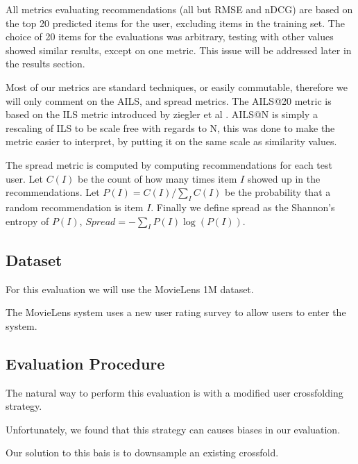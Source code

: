 \documentclass[letterpaper]{sig-alternate}
\begin{document}
  All metrics evaluating recommendations (all but RMSE and nDCG) are based on the top 20 predicted items for the user, excluding items in the training set.
  The choice of 20 items for the evaluations was arbitrary, testing with other values showed similar results, except on one metric.
  This issue will be addressed later in the results section.
  
  Most of our metrics are standard techniques, or easily commutable, therefore we will only comment on the AILS, and spread metrics.
  The AILS@20 metric is based on the ILS metric introduced by ziegler et al \cite{ziegler}.
  AILS@N is simply a rescaling of ILS to be scale free with regards to N, this was done to make the metric easier to interpret, by putting it on the same scale as similarity values.
  
  The spread metric is computed by computing recommendations for each test user.
  Let $C(I)$ be the count of how many times item $I$ showed up in the recommendations.
  Let $P(I) = C(I) / \sum_I C(I)$ be the probability that a random recommendation is item $I$.
  Finally we define spread as the Shannon's entropy of $P(I)$, $Spread = -\sum_I P(I) \log(P(I))$.
  
  \subsection*{Dataset}
  For this evaluation we will use the MovieLens 1M dataset.

  The MovieLens system uses a new user rating survey to allow users to enter the system.
  
  \subsection*{Evaluation Procedure}
  The natural way to perform this evaluation is with a modified user crossfolding strategy.
  
  Unfortunately, we found that this strategy can causes biases in our evaluation.
  
  Our solution to this bais is to downsample an existing crossfold.
\end{document}
